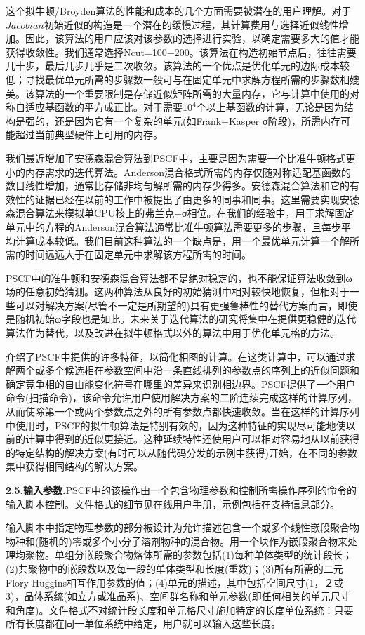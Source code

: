 \documentclass[12pt，a4paper]{article}
\numberwithin{equation}{section}
\begin{document}
这个拟牛顿/Broyden算法的性能和成本的几个方面需要被潜在的用户理解。对于$Jacobian$初始近似的构造是一个潜在的缓慢过程，其计算费用与选择近似线性增加。因此，该算法的用户应该对该参数的选择进行实验，以确定需要多大的值才能获得收敛性。我们通常选择Ncut=100−200。该算法在构造初始节点后，往往需要几十步，最后几步几乎是二次收敛。该算法的一个优点是优化单元的边际成本较低；寻找最优单元所需的步骤数一般可与在固定单元中求解方程所需的步骤数相媲美。该算法的一个重要限制是存储近似矩阵所需的大量内存，它与计算中使用的对称自适应基函数的平方成正比。对于需要$10^4$个以上基函数的计算，无论是因为结构是强的，还是因为它有一个复杂的单元(如Frank−Kasper σ阶段)，所需内存可能超过当前典型硬件上可用的内存。

我们最近增加了安德森混合算法到PSCF中，主要是因为需要一个比准牛顿格式更小的内存需求的迭代算法。Anderson混合格式所需的内存仅随对称适配基函数的数目线性增加，通常比存储非均匀解所需的内存少得多。安德森混合算法和它的有效性的证据已经在以前的工作中被提出了由更多的同事和同事。这里需要实现安德森混合算法来模拟单CPU核上的弗兰克−σ相位。在我们的经验中，用于求解固定单元中的方程的Anderson混合算法通常比准牛顿算法需要更多的步骤，且每步平均计算成本较低。我们目前这种算法的一个缺点是，用一个最优单元计算一个解所需的时间远远大于在固定单元中求解该方程所需的时间。

PSCF中的准牛顿和安德森混合算法都不是绝对稳定的，也不能保证算法收敛到ω场的任意初始猜测。这两种算法从良好的初始猜测中相对较快地恢复，但相对于一些可以对解决方案(尽管不一定是所期望的)具有更强鲁棒性的替代方案而言，即使是随机初始ω字段也是如此。未来关于迭代算法的研究将集中在提供更稳健的迭代算法作为替代，以及改进在拟牛顿格式以外的算法中用于优化单元格的方法。

介绍了PSCF中提供的许多特征，以简化相图的计算。在这类计算中，可以通过求解两个或多个候选相在参数空间中沿一条直线排列的参数点的序列上的近似问题和确定竞争相的自由能变化符号在哪里的差异来识别相边界。PSCF提供了一个用户命令(扫描命令)，该命令允许用户使用解决方案的二阶连续完成这样的计算序列，从而使除第一个或两个参数点之外的所有参数点都快速收敛。当在这样的计算序列中使用时，PSCF的拟牛顿算法是特别有效的，因为这种特征的实现尽可能地使以前的计算中得到的近似更接近。这种延续特性还使用户可以相对容易地从以前获得的特定结构的解决方案(有时可以从随代码分发的示例中获得)开始，在不同的参数集中获得相同结构的解决方案。

\textbf{2.5.输入参数.}PSCF中的该操作由一个包含物理参数和控制所需操作序列的命令的输入脚本控制。文件格式的细节见在线用户手册，示例包括在支持信息部分。

输入脚本中指定物理参数的部分被设计为允许描述包含一个或多个线性嵌段聚合物物种和(随机的)零或多个小分子溶剂物种的混合物。用一个块作为嵌段聚合物来处理均聚物。单组分嵌段聚合物熔体所需的参数包括(1)每种单体类型的统计段长；(2)共聚物中的嵌段数以及每一段的单体类型和长度(重数)；(3)所有所需的二元Flory-Huggins相互作用参数的值；(4)单元的描述，其中包括空间尺寸(1，２或3)，晶体系统(如立方或准晶系)、空间群名称和单元参数(即任何相关的单元尺寸和角度)。文件格式不对统计段长度和单元格尺寸施加特定的长度单位系统：只要所有长度都在同一单位系统中给定，用户就可以输入这些长度。
\end{document}
